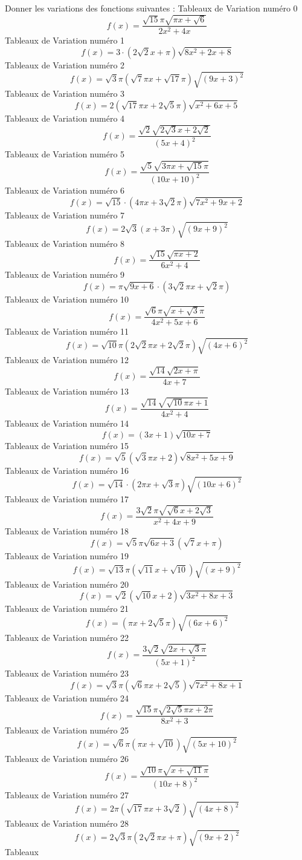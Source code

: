 \documentclass{article}
\begin{document}
 Donner les variations des fonctions suivantes : 
Tableaux de Variation num\'ero 0 \[f(x) = \frac{\sqrt{15} \pi \sqrt{\pi x + \sqrt{6}}}{2 x^{2} + 4 x}\]Tableaux de Variation num\'ero 1 \[f(x) = 3 \cdot \left(2 \sqrt{2} x + \pi\right) \sqrt{8 x^{2} + 2 x + 8}\]Tableaux de Variation num\'ero 2 \[f(x) = \sqrt{3} \pi \left(\sqrt{7} \pi x + \sqrt{17} \pi\right) \sqrt{\left(9 x + 3\right)^{2}}\]Tableaux de Variation num\'ero 3 \[f(x) = 2 \left(\sqrt{17} \pi x + 2 \sqrt{5} \pi\right) \sqrt{x^{2} + 6 x + 5}\]Tableaux de Variation num\'ero 4 \[f(x) = \frac{\sqrt{2} \sqrt{2 \sqrt{3} x + 2 \sqrt{2}}}{\left(5 x + 4\right)^{2}}\]Tableaux de Variation num\'ero 5 \[f(x) = \frac{\sqrt{5} \sqrt{3 \pi x + \sqrt{15} \pi}}{\left(10 x + 10\right)^{2}}\]Tableaux de Variation num\'ero 6 \[f(x) = \sqrt{15} \cdot \left(4 \pi x + 3 \sqrt{2} \pi\right) \sqrt{7 x^{2} + 9 x + 2}\]Tableaux de Variation num\'ero 7 \[f(x) = 2 \sqrt{3} \left(x + 3 \pi\right) \sqrt{\left(9 x + 9\right)^{2}}\]Tableaux de Variation num\'ero 8 \[f(x) = \frac{\sqrt{15} \sqrt{\pi x + 2}}{6 x^{2} + 4}\]Tableaux de Variation num\'ero 9 \[f(x) = \pi \sqrt{9 x + 6} \cdot \left(3 \sqrt{2} \pi x + \sqrt{2} \pi\right)\]Tableaux de Variation num\'ero 10 \[f(x) = \frac{\sqrt{6} \pi \sqrt{x + \sqrt{3} \pi}}{4 x^{2} + 5 x + 6}\]Tableaux de Variation num\'ero 11 \[f(x) = \sqrt{10} \pi \left(2 \sqrt{2} \pi x + 2 \sqrt{2} \pi\right) \sqrt{\left(4 x + 6\right)^{2}}\]Tableaux de Variation num\'ero 12 \[f(x) = \frac{\sqrt{14} \sqrt{2 x + \pi}}{4 x + 7}\]Tableaux de Variation num\'ero 13 \[f(x) = \frac{\sqrt{14} \sqrt{\sqrt{10} \pi x + 1}}{4 x^{2} + 4}\]Tableaux de Variation num\'ero 14 \[f(x) = \left(3 x + 1\right) \sqrt{10 x + 7}\]Tableaux de Variation num\'ero 15 \[f(x) = \sqrt{5} \left(\sqrt{3} \pi x + 2\right) \sqrt{8 x^{2} + 5 x + 9}\]Tableaux de Variation num\'ero 16 \[f(x) = \sqrt{14} \cdot \left(2 \pi x + \sqrt{3} \pi\right) \sqrt{\left(10 x + 6\right)^{2}}\]Tableaux de Variation num\'ero 17 \[f(x) = \frac{3 \sqrt{2} \pi \sqrt{\sqrt{6} x + 2 \sqrt{3}}}{x^{2} + 4 x + 9}\]Tableaux de Variation num\'ero 18 \[f(x) = \sqrt{5} \pi \sqrt{6 x + 3} \left(\sqrt{7} x + \pi\right)\]Tableaux de Variation num\'ero 19 \[f(x) = \sqrt{13} \pi \left(\sqrt{11} x + \sqrt{10}\right) \sqrt{\left(x + 9\right)^{2}}\]Tableaux de Variation num\'ero 20 \[f(x) = \sqrt{2} \left(\sqrt{10} x + 2\right) \sqrt{3 x^{2} + 8 x + 3}\]Tableaux de Variation num\'ero 21 \[f(x) = \left(\pi x + 2 \sqrt{5} \pi\right) \sqrt{\left(6 x + 6\right)^{2}}\]Tableaux de Variation num\'ero 22 \[f(x) = \frac{3 \sqrt{2} \sqrt{2 x + \sqrt{3} \pi}}{\left(5 x + 1\right)^{2}}\]Tableaux de Variation num\'ero 23 \[f(x) = \sqrt{3} \pi \left(\sqrt{6} \pi x + 2 \sqrt{5}\right) \sqrt{7 x^{2} + 8 x + 1}\]Tableaux de Variation num\'ero 24 \[f(x) = \frac{\sqrt{15} \pi \sqrt{2 \sqrt{5} \pi x + 2 \pi}}{8 x^{2} + 3}\]Tableaux de Variation num\'ero 25 \[f(x) = \sqrt{6} \pi \left(\pi x + \sqrt{10}\right) \sqrt{\left(5 x + 10\right)^{2}}\]Tableaux de Variation num\'ero 26 \[f(x) = \frac{\sqrt{10} \pi \sqrt{x + \sqrt{11} \pi}}{\left(10 x + 8\right)^{2}}\]Tableaux de Variation num\'ero 27 \[f(x) = 2 \pi \left(\sqrt{17} \pi x + 3 \sqrt{2}\right) \sqrt{\left(4 x + 8\right)^{2}}\]Tableaux de Variation num\'ero 28 \[f(x) = 2 \sqrt{3} \pi \left(2 \sqrt{2} \pi x + \pi\right) \sqrt{\left(9 x + 2\right)^{2}}\]Tableaux 
\end{document}
